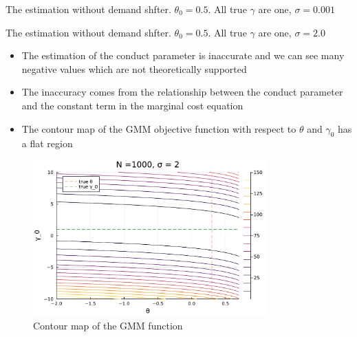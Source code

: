 \documentclass[aspectratio = 169]{beamer}
\theoremstyle{definition}
\begin{document}
\begin{frame}{}
        \begin{table}[]
        \centering
        \tiny
        \caption{The estimation without demand shfter. $\theta_0 = 0.5$. All true $\gamma$ are one, $\sigma = 0.001$}
        \label{tab:linear_without_demand}
    \end{table}
\end{frame}


\begin{frame}{}
        \begin{table}[]
        \centering
        \tiny
        \caption{The estimation without demand shfter. $\theta_0 = 0.5$. All true $\gamma$ are one, $\sigma = 2.0$}
        \label{tab:linear_without_demand}
    \end{table}
\end{frame}

\begin{frame}{}
    \begin{itemize}
        \item The estimation of the conduct parameter is inaccurate and we can see many negative values which are not theoretically supported
        \item The inaccuracy comes from the relationship between the conduct parameter and the constant term in the marginal cost equation
        \item The contour map of the GMM objective function with respect to $\theta$ and $\gamma_0$ has a flat region
    \end{itemize}
\end{frame}

\begin{frame}{}
    \begin{figure}
        \centering
        \includegraphics[width = 9cm]{figuretable/contour_loglinear_loglinear_n_1000_sigma_2.pdf}
        \caption{Contour map of the GMM function}
        \label{fig:contour_map}
    \end{figure}
\end{frame}
\end{document}
